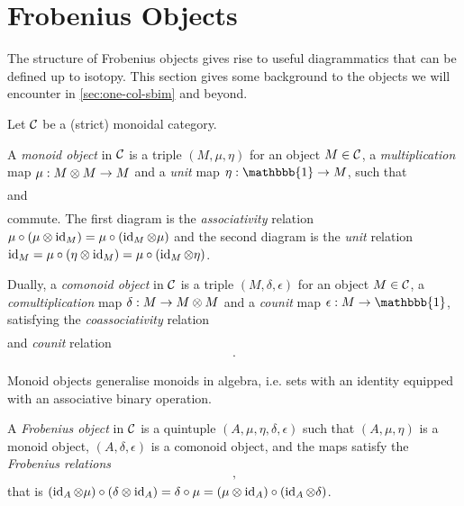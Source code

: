\section{Frobenius Objects}
\label{sec:frob-object}

The structure of Frobenius objects gives rise to useful diagrammatics that can be defined up to isotopy. This section gives some background to the objects we will encounter in \autoref{sec:one-col-sbim} and beyond.

Let $\mathcal{C}$ be a (strict) monoidal category.

\begin{definition}
    A \textit{monoid object} in $\mathcal{C}$ is a triple $(M,\mu,\eta)$ for an object $M \in \mathcal{C}$, a \textit{multiplication} map $\mu: M \otimes M \to M$ and a \textit{unit} map $\eta: \mathbbb{1} \to M$, such that
    \begin{gather*}
        
    \end{gather*}
    and
    \begin{gather*}
        
    \end{gather*}
    commute. The first diagram is the \textit{associativity} relation $\mu \circ (\mu \otimes \operatorname{id}_M) = \mu \circ (\operatorname{id}_M \otimes \mu)$ and the second diagram is the \textit{unit} relation $\operatorname{id}_M = \mu \circ (\eta \otimes \operatorname{id}_M) = \mu \circ (\operatorname{id}_M \otimes \eta)$.

    Dually, a \textit{comonoid object} in $\mathcal{C}$ is a triple $(M,\delta,\epsilon)$ for an object $M \in \mathcal{C}$, a \textit{comultiplication} map $\delta: M \to M \otimes M$ and a \textit{counit} map $\epsilon: M \to \mathbbb{1}$, satisfying the \textit{coassociativity} relation
    \begin{gather*}
        
    \end{gather*}
    and \textit{counit} relation
    \begin{gather*}
        .
    \end{gather*}
\end{definition}

Monoid objects generalise monoids in algebra, i.e. sets with an identity equipped with an associative binary operation.

\begin{definition}
    A \textit{Frobenius object} in $\mathcal{C}$ is a quintuple $(A,\mu,\eta,\delta,\epsilon)$ such that $(A,\mu,\eta)$ is a monoid object, $(A,\delta,\epsilon)$ is a comonoid object, and the maps satisfy the \textit{Frobenius relations}
    \begin{gather*}
        ,
    \end{gather*}
    that is $(\operatorname{id}_A \otimes \mu) \circ (\delta \otimes \operatorname{id}_A) = \delta \circ \mu = (\mu \otimes \operatorname{id}_A) \circ (\operatorname{id}_A \otimes \delta)$.
\end{definition}


